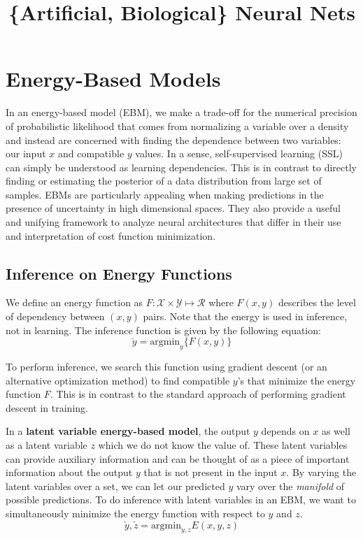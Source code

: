 \documentclass{article}
\title{\vspace{-3cm} \{Artificial, Biological\} Neural Nets }
\author{}
\date{}
\begin{document}
\maketitle
\vspace{-1.5cm}
\tableofcontents
\newpage

\section{Energy-Based Models}
In an energy-based model (EBM), we make a trade-off for the numerical precision of probabilistic likelihood that comes from normalizing a variable over a density and instead are concerned with finding the dependence between two variables: our input $x$ and compatible $y$ values. In a sense, self-supervised learning (SSL) can simply be understood as learning dependencies. This is in contrast to directly finding or estimating the posterior of a data distribution from large set of samples. EBMs are particularly appealing when making predictions in the presence of uncertainty in high dimensional spaces. They also provide a useful and unifying framework to analyze neural architectures that differ in their use and interpretation of cost function minimization. 

\subsection{Inference on Energy Functions}
We define an energy function as $F: \mathcal X \times \mathcal Y \mapsto \mathcal R$ where $F(x,y)$ describes the level of dependency between $(x, y)$ pairs. Note that the energy is used in inference, not in learning. The inference function is given by the following equation:
\[
\check y = \text{argmin}_y\{ F(x,y)\}
\]

To perform inference, we search this function using gradient descent (or an alternative optimization method) to find compatible $y$’s that minimize the energy function $F$. This is in contrast to the standard approach of performing gradient descent in training.

In a \textbf{latent variable energy-based model}, the output $y$ depends on $x$ as well as a latent variable $z$ which we do not know the value of. These latent variables can provide auxiliary information and can be thought of as a piece of important information about the output $y$ that is not present in the input $x$. By varying the latent variables over a set, we can let our predicted $y$ vary over the \textit{manifold} of possible predictions. To do inference with latent variables in an EBM, we want to simultaneously minimize the energy function with respect to $y$ and $z$.
\[
\check y, \check z = \text{argmin}_{y,z} E(x,y,z)
\]
\end{document}
